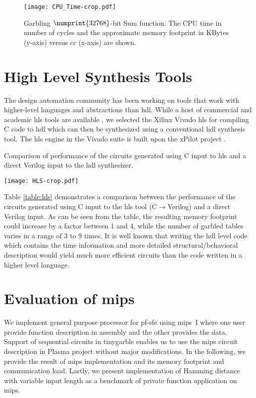 \begin{figure}[ht]
	\centering
	\texttt{[image: CPU\_Time-crop.pdf]}
	\caption{Garbling $\numprint{32768}$-bit Sum function.
The CPU time in number of cycles and the approximate memory footprint in KBytes (y-axis) versus $cc$ (x-axis) are shown.}
	\label{fig:cpu_time}
\end{figure}

\section{High Level Synthesis Tools}
The design automation community has been working on tools that work with higher-level languages and abstractions than \acrshort{hdl}.
While a host of commercial and academic \acrshort{hls} tools are available \cite{tool:Vivado, tool:PandA, decaluwe2004myhdl, Gupta2004}, we selected the Xilinx Vivado \acrshort{hls} for compiling C code to \acrshort{hdl} which can then be synthesized using a conventional \acrshort{hdl} synthesis tool.
The \acrshort{hls} engine in the Vivado suite is built upon the xPilot project \cite{Chapter:Zhang2008}.

\begin{table*}[t]
\centering
\caption{Comparison of performance of the circuits generated using C input to \acrshort{hls} and a direct Verilog input to the \acrshort{hdl} synthesizer.}
\label{table:hls}
\texttt{[image: HLS-crop.pdf]}
\end{table*}

Table \ref{table:hls} demonstrates a comparison between the performance of the circuits generated using C input to the \acrshort{hls} tool (C$\rightarrow$Verilog) and a direct Verilog input.
As can be seen from the table, the resulting memory footprint could increase by a factor between 1 and 4, while the number of garbled tables varies in a range of 3 to 9 times.
It is well known that writing the \acrshort{hdl} level code which contains the time information and more detailed structural/behavioral description would yield much more efficient circuits than the code written in a higher level language.

\section{Evaluation of \gls{mips}}
We implement general purpose processor for \acrshort{pf-sfe} using \gls{mips}~I where one user provide function description in assembly and the other provides the data.
Support of sequential circuits in \gls{tinygarble} enables us to use the \gls{mips} circuit description in Plasma project \cite{rhoads2006plasma} without major modifications.
In the following, we provide the result of \gls{mips} implementation and its memory footprint and communication load.
Lastly, we present implementation of Hamming distance with variable input length as a benchmark of private function application on \gls{mips}.


